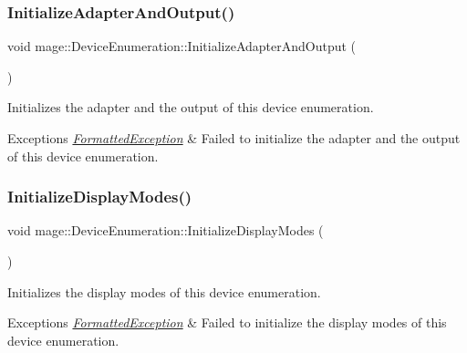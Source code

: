 \subsubsection{\texorpdfstring{Initialize\+Adapter\+And\+Output()}{InitializeAdapterAndOutput()}}
{\footnotesize\ttfamily void mage\+::\+Device\+Enumeration\+::\+Initialize\+Adapter\+And\+Output (\begin{DoxyParamCaption}{ }\end{DoxyParamCaption})\hspace{0.3cm}{\ttfamily [private]}}

Initializes the adapter and the output of this device enumeration.


\begin{DoxyExceptions}{Exceptions}
{\em \hyperlink{structmage_1_1_formatted_exception}{Formatted\+Exception}} & Failed to initialize the adapter and the output of this device enumeration. \\
\hline
\end{DoxyExceptions}
\hypertarget{classmage_1_1_device_enumeration_af6411210d27162b033afcb9693dec301}{}\label{classmage_1_1_device_enumeration_af6411210d27162b033afcb9693dec301} 
\subsubsection{\texorpdfstring{Initialize\+Display\+Modes()}{InitializeDisplayModes()}}
{\footnotesize\ttfamily void mage\+::\+Device\+Enumeration\+::\+Initialize\+Display\+Modes (\begin{DoxyParamCaption}{ }\end{DoxyParamCaption})\hspace{0.3cm}{\ttfamily [private]}}

Initializes the display modes of this device enumeration.


\begin{DoxyExceptions}{Exceptions}
{\em \hyperlink{structmage_1_1_formatted_exception}{Formatted\+Exception}} & Failed to initialize the display modes of this device enumeration. \\
\hline
\end{DoxyExceptions}
\hypertarget{classmage_1_1_device_enumeration_a08fc72e65a9dbb218312502409c3ef57}{}\label{classmage_1_1_device_enumeration_a08fc72e65a9dbb218312502409c3ef57} 
